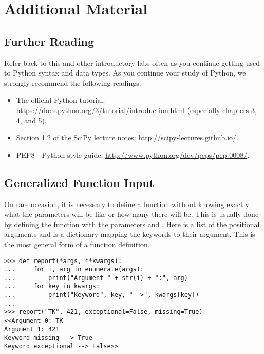 \newpage

\section*{Additional Material} %

\subsection*{Further Reading} %

Refer back to this and other introductory labs often as you continue getting used to Python syntax and data types.
As you continue your study of Python, we strongly recommend the following readings.
\begin{itemize}
\item The official Python tutorial: \url{https://docs.python.org/3/tutorial/introduction.html} (especially chapters 3, 4, and 5).
\item Section 1.2 of the SciPy lecture notes: \url{http://scipy-lectures.github.io/}.
\item PEP8 - Python style guide: \url{http://www.python.org/dev/peps/pep-0008/}.
\end{itemize}

\subsection*{Generalized Function Input} %

On rare occasion, it is necessary to define a function without knowing exactly what the parameters will be like or how many there will be.
This is usually done by defining the function with the parameters  and .
Here  is a list of the positional arguments and  is a dictionary mapping the keywords to their argument.
This is the most general form of a function definition.

\begin{lstlisting}
>>> def report(*args, **kwargs):
...     for i, arg in enumerate(args):
...         print("Argument " + str(i) + ":", arg)
...     for key in kwargs:
...         print("Keyword", key, "-->", kwargs[key])
...
>>> report("TK", 421, exceptional=False, missing=True)
<<Argument 0: TK
Argument 1: 421
Keyword missing --> True
Keyword exceptional --> False>>
\end{lstlisting}

